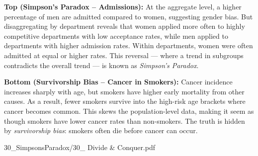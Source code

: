 \begin{SideNotePage}{
  \textbf{Top (Simpson’s Paradox – Admissions):}  
  At the aggregate level, a higher percentage of men are admitted compared to women, suggesting gender bias. But disaggregating by department reveals that women applied more often to highly competitive departments with low acceptance rates, while men applied to departments with higher admission rates. Within departments, women were often admitted at equal or higher rates. This reversal — where a trend in subgroups contradicts the overall trend — is known as \emph{Simpson’s Paradox}. \par
  
  \textbf{Bottom (Survivorship Bias – Cancer in Smokers):}  
  Cancer incidence increases sharply with age, but smokers have higher early mortality from other causes. As a result, fewer smokers survive into the high-risk age brackets where cancer becomes common. This skews the population-level data, making it seem as though smokers have lower cancer rates than non-smokers. The truth is hidden by \emph{survivorship bias}: smokers often die before cancer can occur. \par
  
}{30_SimpsonsParadox/30_ Divide & Conquer.pdf}
\end{SideNotePage}

